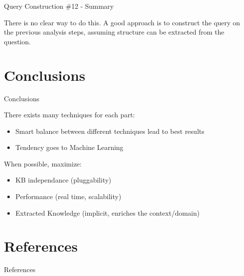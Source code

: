 \documentclass{beamer}
\begin{document}
\begin{frame}{Query Construction \#12 - Summary}
  \begin{card}
    There is no clear way to do this. A good approach is to construct the query on the previous analysis steps, assuming structure can be extracted from the question.
  \end{card}
\end{frame}

\note{}

\section{Conclusions}

\begin{frame}{Conclusions}
  \begin{card}
    There exists many techniques for each part:
    \begin{itemize}
      \item Smart balance between different techniques lead to best results
      \item Tendency goes to Machine Learning
    \end{itemize}
    When possible, maximize:
    \begin{itemize}
      \item KB independance (pluggability)
      \item Performance (real time, scalability)
      \item Extracted Knowledge (implicit, enriches the context/domain)
    \end{itemize}
  \end{card}
\end{frame}


\section{References}

\begin{frame}[allowframebreaks]{References}
    \printbibliography
\end{frame}
\end{document}
